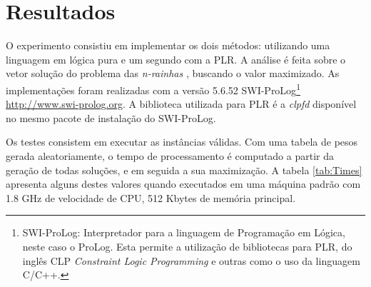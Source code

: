 \documentclass[12pt]{article}
\newenvironment{code}
{\begin{list}{}
{\setlength{\leftmargin}{1.5cm}
\setlength{\rightmargin}{1.5cm}
\lstset{float = {H},
lineskip = -1pt,
captionpos = b,
numbers = left,
numberstyle = \tiny,
basicstyle = \scriptsize,
tabsize = 4}}
\item\scriptsize}
{\end{list}}
\newcommand{\nrainhas}{\emph{n-rainhas }}
\theoremstyle{definition}
\begin{document}





\section{Resultados}
\label{sec_resultados}

O experimento consistiu em implementar os dois métodos: 
utilizando uma linguagem em lógica pura e um segundo com a PLR. A análise é feita sobre o vetor solução do problema das \nrainhas, buscando o valor maximizado. As implementações foram realizadas com a versão 5.6.52 SWI-ProLog\footnote{SWI-ProLog: Interpretador para a linguagem de Programação em Lógica, neste caso o ProLog. Esta permite a  utilização de bibliotecas para PLR, do inglês CLP {\em Constraint Logic Programming} e outras como o uso da linguagem C/C++.} \url{http://www.swi-prolog.org}. A biblioteca utilizada para PLR é a \emph{clpfd} disponível no mesmo pacote de instalação do SWI-ProLog.

Os testes consistem em executar as instâncias válidas. Com uma tabela de pesos gerada aleatoriamente,  o tempo de processamento é computado a partir da geração de todas soluções, e em seguida a sua maximização. A tabela \ref{tab:Times} apresenta alguns destes valores quando executados em uma máquina padrão com 1.8 GHz de velocidade de CPU, 512 Kbytes de memória principal.
\end{document}
